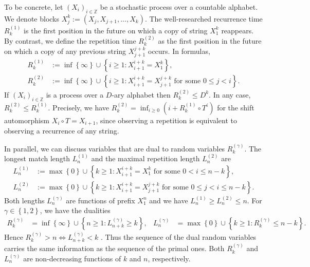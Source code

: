 \documentclass[a4paper,12pt]{article}
\newcommand{\okra}[1]{\left( #1 \right)}
\newcommand{\klam}[1]{\left\{ #1 \right\}}
\begin{document}
To be concrete, let $(X_i)_{i\in\mathbb{Z}}$ be a stochastic process
over a countable alphabet. We denote blocks
$X_j^k:=(X_j,X_{j+1},\ldots,X_k)$. The well-researched recurrence time
$R^{(1)}_k$ is the first position in the future on which a copy of
string $X_1^k$ reappears. By contrast, we define the repetition time
$R^{(2)}_k$ as the first position in the future on which a copy of any
previous string $X_{j+1}^{j+k}$ occurs. In formulas,
\begin{align}
  R^{(1)}_k&:=\inf\klam{\infty}\cup\klam{i\ge 1: X_{i+1}^{i+k}=X_1^k},
  \\
  R^{(2)}_k&:=\inf\klam{\infty}\cup\klam{i\ge 1:
  X_{i+1}^{i+k}=X_{j+1}^{j+k}\text{ for some } 0\le j<i}.
\end{align}
If $(X_i)_{i\in\mathbb{Z}}$ is a process over a $D$-ary alphabet then
$R^{(2)}_k\le D^k$. In any case, $R^{(2)}_k\le R^{(1)}_k$. Precisely,
we have
$R^{(2)}_k=\inf_{i\ge 0}\okra{i+R^{(1)}_k\circ T^i}$
for the shift automorphism $X_i\circ T=X_{i+1}$, since observing a
repetition is equivalent to observing a recurrence of any string.

In parallel, we can discuss variables that are dual to random
variables $R^{(\gamma)}_k$. The longest match length $L^{(1)}_n$
and the maximal repetition length $L^{(2)}_n$ are
\begin{align}
  L^{(1)}_n&:=\max\klam{0}\cup\klam{k\ge 1: X_{i+1}^{i+k}=X_1^k
  \text{ for some } 0< i\le n-k},
  \\
  L^{(2)}_n&:=\max\klam{0}\cup\klam{k\ge 1: X_{i+1}^{i+k}=X_{j+1}^{j+k}
  \text{ for some } 0\le j< i\le n-k}.
\end{align}
Both lengths $L^{(\gamma)}_n$ are functions of prefix $X_1^n$ and we have
$L^{(1)}_n\ge L^{(2)}_n\le n$. For $\gamma\in\klam{1,2}$, we have the
dualities
\begin{align}
  R^{(\gamma)}_k&=\inf\klam{\infty}\cup\klam{n\ge 1: L^{(\gamma)}_{n+k}\ge k},
  &
  L^{(\gamma)}_n&=\max\klam{0}\cup\klam{k\ge 1: R^{(\gamma)}_k\le n-k}.
\end{align}
Hence $R^{(\gamma)}_k>n\iff L^{(\gamma)}_{n+k}<k$
\cite{WynerZiv89}. Thus the sequence of the dual random variables
carries the same information as the sequence of the primal ones. Both
$R^{(\gamma)}_k$ and $L^{(\gamma)}_n$ are non-decreasing functions of
$k$ and $n$, respectively.
\end{document}

